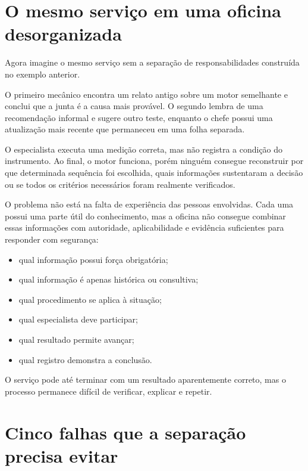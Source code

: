 \documentclass[
  10pt,
  a4paper,
  oneside]{book}
\providecommand{\tightlist}{%
  \setlength{\itemsep}{0pt}\setlength{\parskip}{0pt}}
\begin{document}
\hypertarget{o-mesmo-serviuxe7o-em-uma-oficina-desorganizada}{%
\section{O mesmo serviço em uma oficina
desorganizada}\label{o-mesmo-serviuxe7o-em-uma-oficina-desorganizada}}

Agora imagine o mesmo serviço sem a separação de responsabilidades
construída no exemplo anterior.

O primeiro mecânico encontra um relato antigo sobre um motor semelhante
e conclui que a junta é a causa mais provável. O segundo lembra de uma
recomendação informal e sugere outro teste, enquanto o chefe possui uma
atualização mais recente que permaneceu em uma folha separada.

O especialista executa uma medição correta, mas não registra a condição
do instrumento. Ao final, o motor funciona, porém ninguém consegue
reconstruir por que determinada sequência foi escolhida, quais
informações sustentaram a decisão ou se todos os critérios necessários
foram realmente verificados.

O problema não está na falta de experiência das pessoas envolvidas. Cada
uma possui uma parte útil do conhecimento, mas a oficina não consegue
combinar essas informações com autoridade, aplicabilidade e evidência
suficientes para responder com segurança:

\begin{itemize}
\tightlist
\item
  qual informação possui força obrigatória;
\item
  qual informação é apenas histórica ou consultiva;
\item
  qual procedimento se aplica à situação;
\item
  qual especialista deve participar;
\item
  qual resultado permite avançar;
\item
  qual registro demonstra a conclusão.
\end{itemize}

O serviço pode até terminar com um resultado aparentemente correto, mas
o processo permanece difícil de verificar, explicar e repetir.

\hypertarget{cinco-falhas-que-a-separauxe7uxe3o-precisa-evitar}{%
\section{Cinco falhas que a separação precisa
evitar}\label{cinco-falhas-que-a-separauxe7uxe3o-precisa-evitar}}
\end{document}
